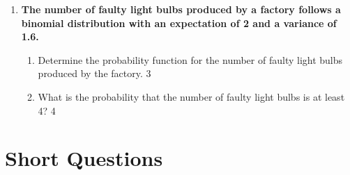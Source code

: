 \documentclass[a4paper,oneside, margin=1.4in]{book}
\begin{document}
\begin{enumerate}
  \begin{enumerate}
    \item
	What is the mean of binomial distribution \hfill 1
    \item
	Can variance be greater than mean in binomial distribution? \hfill 2
    \item  
	Determine the probability function of the number of defective items 
	produced by the company. \hfill 3
    \item
	What is the probability that the number of defective items is no
	less than 3? \hfill 4
  \end{enumerate}
  \item
	  \textbf{The number of faulty light bulbs produced by a factory 
	  follows a binomial distribution with an expectation of 2 and a 
	  variance of 1.6.} 
  
  \begin{enumerate}
    \item  
	Determine the probability function for the number of faulty light 
	bulbs produced by the factory. \hfill 3
    \item
	What is the probability that the number of faulty light bulbs is 
	at least 4? \hfill 4
  \end{enumerate}

  
  \end{enumerate}

\section{Short Questions}
\end{document}
